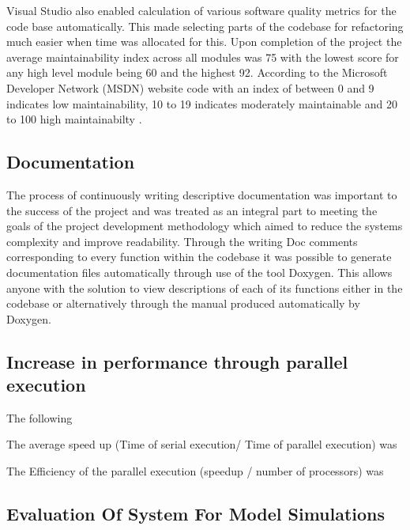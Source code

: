 \noindent
Visual Studio also enabled calculation of various software quality metrics for the code base automatically. This made selecting parts of the codebase for refactoring much easier when time was allocated for this. Upon completion of the project the average maintainability index across all modules was 75 with the lowest score for any high level module being 60 and the highest 92. According to the Microsoft Developer Network (MSDN) website code with an index of between 0 and 9 indicates low maintainability, 10 to 19 indicates moderately maintainable and 20 to 100 high maintainabilty \cite{VisualStudioMaintainIndex}.

\subsection{Documentation}
The process of continuously writing descriptive documentation was important to the success of the project and was treated as an integral part to meeting the goals of the project development methodology which aimed to reduce the systems complexity and improve readability. Through the writing Doc comments corresponding to every function within the codebase it was possible to generate documentation files automatically through use of the tool Doxygen. This allows anyone with the solution to view descriptions of each of its functions either in the codebase or alternatively through the manual produced automatically by Doxygen.



\subsection{Increase in performance through parallel execution}
The following 

The average speed up (Time of serial execution/ Time of parallel execution) was 

The Efficiency of the parallel execution (speedup / number of processors) was
 

\subsection{Evaluation Of System For Model Simulations}


